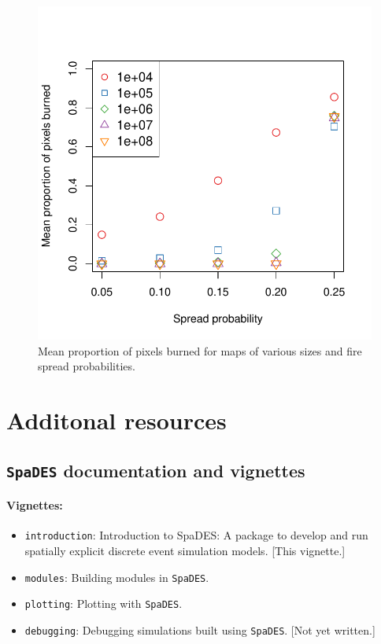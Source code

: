 \documentclass{article}
\begin{document}
\begin{figure}[!htbp]
  \centering
  \includegraphics[width=5in]{../inst/plot-area-burned.pdf}
	\caption{Mean proportion of pixels burned for maps of various sizes and fire spread probabilities.}
	\label{figure-area-burned}
\end{figure}

\newpage

\section{Additonal resources}

\subsection{\texttt{SpaDES} documentation and vignettes}

\paragraph{Vignettes:}

\begin{itemize}
  \item \texttt{introduction}: Introduction to SpaDES: A package to develop and run spatially explicit discrete event simulation models. [This vignette.]
  \item \texttt{modules}: Building modules in \texttt{SpaDES}.
  \item \texttt{plotting}: Plotting with \texttt{SpaDES}.
  \item \texttt{debugging}: Debugging simulations built using \texttt{SpaDES}. [Not yet written.]
\end{itemize}
\end{document}
